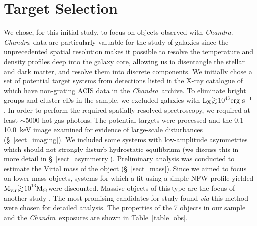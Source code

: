 \documentclass{emulateapj}
\def\spose#1{\hbox to 0pt{#1\hss}}
\def\gtsim{$\mathrel{\spose{\lower 3pt\hbox{$\sim$}} 
        \raise 2.0pt\hbox{$>$}}$\thinspace}
\def \msun {${\rm M_\odot}$}
\newcommand{\mvir}{${\rm M_{vir}}$}
\newcommand{\chandra }{{\em Chandra}}
\newcommand{\ergps}{${\rm erg\ s^{-1}}$}
\newcommand{\lx }{${\rm L_X}$}
\begin{document}
\section{Target Selection} \label{sect_targets}
We chose, for this initial study, to focus on objects observed with
\chandra. \chandra\ data are particularly valuable
for the study of galaxies since the unprecedented spatial resolution
makes it possible to resolve the temperature and density profiles
deep into the galaxy core, allowing us to disentangle the stellar
and dark matter, and resolve them into discrete components.
We initially chose a set of potential target systems from detections
listed in the X-ray
catalogue of \citet{osullivan01a} which have non-grating ACIS
data in the \chandra\ archive. To eliminate bright 
groups and cluster cDs in the sample, we excluded galaxies with 
\lx\gtsim $10^{43}$\ergps. In order to perform the required spatially-resolved
spectroscopy, we required at least $\sim$5000 hot gas photons. 
The potential targets were processed
and the 0.1--10.0~keV image examined for evidence of large-scale
disturbances (\S~\ref{sect_imaging}). We included some systems
with low-amplitude asymmetries which should not strongly 
disturb hydrostatic equilibrium (we discuss this in more detail in
\S~\ref{sect_asymmetry}).
Preliminary analysis was conducted to estimate the Virial mass of 
the object (\S~\ref{sect_mass}). Since we aimed to focus on
lower-mass objects, systems for which a fit
using a simple NFW profile yielded \mvir\gtsim $10^{13}$\msun were
discounted. Massive objects of this type are the focus of another study
\citep{gastaldello06a}. The most promising
candidates for study found {\em via} this method were chosen for detailed
analysis. The properties of the 7 objects in our sample
and the \chandra\ exposures are shown in Table~\ref{table_obs}.
\end{document}
